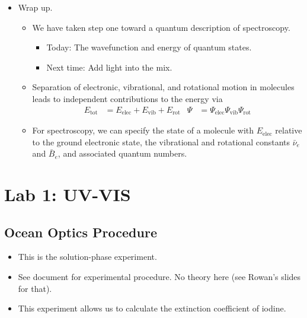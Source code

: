 \documentclass[../notes.tex]{subfiles}
\begin{document}
\begin{itemize}
\begin{itemize}
\begin{itemize}
            \item $E_\text{vib}$ is \SIrange{e2}{e3}{\per\centi\meter};
            \item $E_\text{rot}$ is \SIrange{e-1}{e1}{\per\centi\meter}.
            \item The scale of electronic differences, vs. vibrational differences, vs. rotational differences is shown in Figure \ref{fig:qmechEnergySpacing}.
        \end{itemize}
        \item We can summarize the state of the system from an energy point of view by specifying vibrational and rotational constants ($\bar{\nu}_e$ and $\bar{B}$) and their associated quantum numbers ($\nu$ and $J$).
    \end{itemize}
    \item Wrap up.
    \begin{itemize}
        \item We have taken step one toward a quantum description of spectroscopy.
        \begin{itemize}
            \item Today: The wavefunction and energy of quantum states.
            \item Next time: Add light into the mix.
        \end{itemize}
        \item Separation of electronic, vibrational, and rotational motion in molecules leads to independent contributions to the energy via
        \begin{align*}
            E_\text{tot} &= E_\text{elec}+E_\text{vib}+E_\text{rot}&
            \Psi &= \Psi_\text{elec}\Psi_\text{vib}\Psi_\text{rot}
        \end{align*}
        \item For spectroscopy, we can specify the state of a molecule with $E_\text{elec}$ relative to the ground electronic state, the vibrational and rotational constants $\bar{\nu}_e$ and $\bar{B}_e$, and associated quantum numbers.
    \end{itemize}
\end{itemize}



\section{Lab 1: UV-VIS}
\subsection*{Ocean Optics Procedure}
\begin{itemize}
    \item This is the solution-phase experiment.
    \item See document for experimental procedure. No theory here (see Rowan's slides for that).
    \item This experiment allows us to calculate the extinction coefficient of iodine.
\end{itemize}
\end{document}
